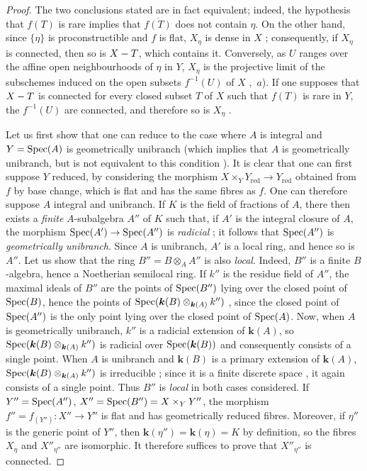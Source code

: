 \begin{proof}
The two conclusions stated are in fact equivalent;
indeed, the hypothesis that $f(T)$ is rare implies that $\overline{f(T)}$ does not contain $\eta$.
On the other hand, since $\{\eta\}$ is proconstructible  and $f$ is flat, $X_\eta$ is dense in $X$ ; consequently, if $X_\eta$ is connected, then so is $X- T$, which contains it.
Conversely, as $U$ ranges over the affine open neighbourhoods of $\eta$ in $Y$, $X_\eta$ is the projective limit of the subschemes induced on the open subsets $f^{-1}(U)$ of $X$ ,~$a$).
If one supposes that $X- T$ is connected for every closed subset $T$ of $X$ such that $f(T)$ is rare in $Y$, the $f^{-1}(U)$ are connected, and therefore so is $X_\eta$ .

Let us first show that one can reduce to the case where $A$ is integral and $Y=\operatorname{Spec}(A)$ is geometrically unibranch  (which implies that $A$ is geometrically unibranch, but is not equivalent to this condition ).
It is clear that one can first suppose $Y$ reduced, by considering the morphism $X\times_{Y}Y_{\mathrm{red}}\to Y_{\mathrm{red}}$ obtained from $f$ by base change, which is flat and has the same fibres as $f$.
One can therefore suppose $A$ integral and unibranch.
If $K$ is the field of fractions of $A$, there then exists a \emph{finite} $A$-subalgebra $A''$ of $K$ such that, if $A'$ is the integral closure of $A$, the morphism $\operatorname{Spec}(A')\to\operatorname{Spec}(A'')$ is \emph{radicial} ; it follows  that $\operatorname{Spec}(A'')$ is \emph{geometrically unibranch}.
Since $A$ is unibranch, $A'$ is a local ring, and hence so is $A''$.
Let us show that the ring $B''=B\otimes_{A}A''$ is also \emph{local}.
Indeed, $B''$ is a finite $B$-algebra, hence a Noetherian semilocal ring.
If $k''$ is the residue field of $A''$, the maximal ideals of $B''$ are the points of $\operatorname{Spec}(B'')$ lying over the closed point of $\operatorname{Spec}(B)$, hence the points of $\operatorname{Spec}(\boldsymbol{k}(B)\otimes_{\boldsymbol{k}(A)}k'')$ ,
since the closed point of $\operatorname{Spec}(A'')$ is the only point lying over the closed point of $\operatorname{Spec}(A)$.
Now, when $A$ is geometrically unibranch, $k''$ is a radicial extension of $\boldsymbol{k}(A)$, so $\operatorname{Spec}(\boldsymbol{k}(B)\otimes_{\boldsymbol{k}(A)}k'')$ is radicial over $\operatorname{Spec}(\boldsymbol{k}(B))$ and consequently consists of a single point.
When $A$ is unibranch and $\boldsymbol{k}(B)$ is a primary extension of $\boldsymbol{k}(A)$, $\operatorname{Spec}(\boldsymbol{k}(B)\otimes_{\boldsymbol{k}(A)}k'')$ is irreducible ; since it is a finite discrete space , it again consists of a single point.
Thus $B''$ is \emph{local} in both cases considered.
If $Y''=\operatorname{Spec}(A'')$, $X''=\operatorname{Spec}(B'')=X\times_{Y}Y''$, the morphism $f''=f_{(Y'')}:X''\to Y''$ is flat and has geometrically reduced fibres.
Moreover, if $\eta''$ is the generic point of $Y''$, then $\boldsymbol{k}(\eta'')=\boldsymbol{k}(\eta)=K$ by definition, so the fibres $X_\eta$ and $X''_{\eta''}$ are isomorphic.
It therefore suffices to prove that $X''_{\eta''}$ is connected.
\end{proof}

